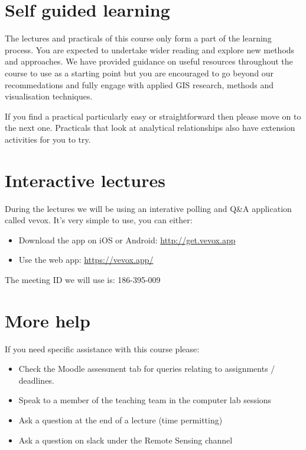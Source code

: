 \documentclass[
]{book}
\providecommand{\tightlist}{%
  \setlength{\itemsep}{0pt}\setlength{\parskip}{0pt}}
\begin{document}
\hypertarget{self-guided-learning}{%
\section*{Self guided learning}\label{self-guided-learning}}

The lectures and practicals of this course only form a part of the learning process. You are expected to undertake wider reading and explore new methods and approaches. We have provided guidance on useful resources throughout the course to use as a starting point but you are encouraged to go beyond our recommedations and fully engage with applied GIS research, methods and visualisation techniques.

If you find a practical particularly easy or straightforward then please move on to the next one. Practicals that look at analytical relationships also have extension activities for you to try.

\hypertarget{interactive-lectures}{%
\section*{Interactive lectures}\label{interactive-lectures}}

During the lectures we will be using an interative polling and Q\&A application called vevox. It's very simple to use, you can either:

\begin{itemize}
\tightlist
\item
  Download the app on iOS or Android: \url{http://get.vevox.app}
\item
  Use the web app: \url{https://vevox.app/}
\end{itemize}

The meeting ID we will use is: 186-395-009

\hypertarget{more-help}{%
\section*{More help}\label{more-help}}

If you need specific assistance with this course please:

\begin{itemize}
\item
  Check the Moodle assessment tab for queries relating to assignments / deadlines.
\item
  Speak to a member of the teaching team in the computer lab sessions
\item
  Ask a question at the end of a lecture (time permitting)
\item
  Ask a question on slack under the Remote Sensing channel
\end{itemize}
\end{document}

